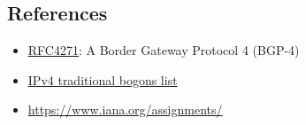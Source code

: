 \documentclass[documentation]{subfiles}
\begin{document}


\subsection{References}
\begin{itemize}
    \item \href{https://tools.ietf.org/html/rfc4271}{RFC4271}: A Border Gateway Protocol 4 (BGP-4)
    \item \href{https://www.team-cymru.org/Services/Bogons/bogon-bn-agg.txt}{IPv4 traditional bogons list}\label{bgp:tradbogons}
    \item \url{https://www.iana.org/assignments/}
\end{itemize}
\end{document}
